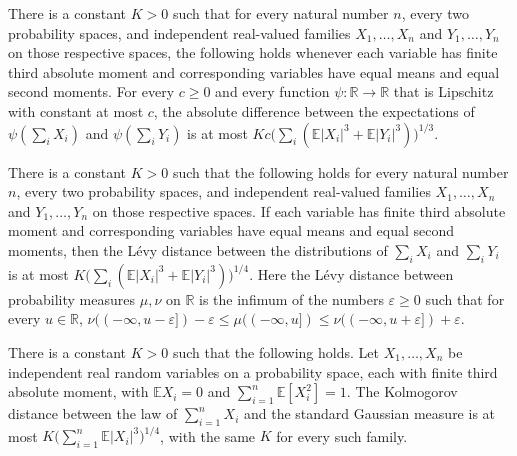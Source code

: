 \begin{theorem}
\label{BooleanAnalysis.GaussianSpace.sum_invariance_lipschitz}
\leanok
{}
There is a constant $K>0$ such that for every natural number $n$, every two probability
spaces, and independent real-valued families $X_1,\ldots,X_n$ and $Y_1,\ldots,Y_n$ on
those respective spaces, the following holds whenever each variable has finite third
absolute moment and corresponding variables have equal means and equal second moments.
For every $c\ge0$ and every function $\psi\colon\mathbb R\to\mathbb R$ that is Lipschitz
with constant at most $c$, the absolute difference between the expectations of
$\psi(\sum_iX_i)$ and $\psi(\sum_iY_i)$ is at most $Kc\bigl(\sum_i(\mathbb
E|X_i|^3+\mathbb E|Y_i|^3)\bigr)^{1/3}$.
\end{theorem}

\begin{theorem}
\label{BooleanAnalysis.GaussianSpace.sum_invariance_levy}
\leanok
{}
There is a constant $K>0$ such that the following holds for every natural number $n$,
every two probability spaces, and independent real-valued families $X_1,\ldots,X_n$ and
$Y_1,\ldots,Y_n$ on those respective spaces. If each variable has finite third absolute
moment and corresponding variables have equal means and equal second moments, then the
Lévy distance between the distributions of $\sum_i X_i$ and $\sum_i Y_i$ is at most
$K\bigl(\sum_i(\mathbb E|X_i|^3+\mathbb E|Y_i|^3)\bigr)^{1/4}$. Here the Lévy distance
between probability measures $\mu,\nu$ on $\mathbb R$ is the infimum of the numbers
$\varepsilon\ge0$ such that for every $u\in\mathbb R$, $\nu(( -\infty,u-\varepsilon])
-\varepsilon\le\mu(( -\infty,u])\le\nu(( -\infty,u+\varepsilon]) +\varepsilon$.
\end{theorem}

\begin{theorem}
\label{BooleanAnalysis.GaussianSpace.berryEsseen_quarter_power}
\leanok
{}
There is a constant $K>0$ such that the following holds. Let $X_1,\ldots,X_n$ be
independent real random variables on a probability space, each with finite third
absolute moment, with $\mathbb E X_i=0$ and $\sum_{i=1}^n\mathbb E[X_i^2]=1$. The
Kolmogorov distance between the law of $\sum_{i=1}^n X_i$ and the standard Gaussian
measure is at most $K\bigl(\sum_{i=1}^n\mathbb E|X_i|^3\bigr)^{1/4}$, with the same $K$
for every such family.
\end{theorem}
